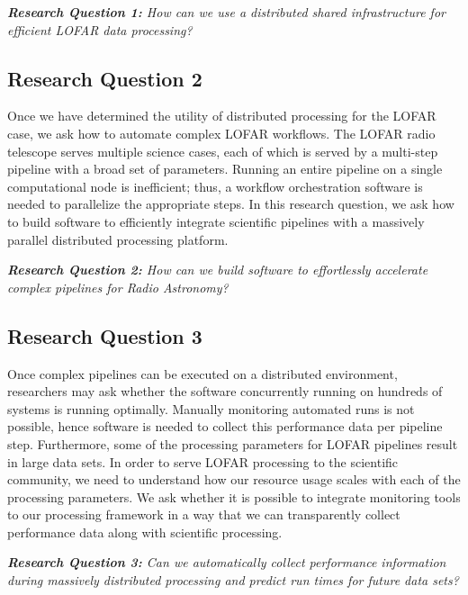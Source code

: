 \begin{addmargin}[4em]{8em}%
    \emph{\textbf{Research Question 1:} How can we use a distributed shared infrastructure for efficient LOFAR data processing?}
\end{addmargin}

\subsection{Research Question 2}

Once we have determined the utility of distributed processing for the LOFAR case, we ask how to automate complex LOFAR workflows. The LOFAR radio telescope serves multiple science cases, each of which is served by a multi-step pipeline with a broad set of parameters. Running an entire pipeline on a single computational node is inefficient; thus, a workflow orchestration software is needed to parallelize the appropriate steps. In this research question, we ask how to build software to efficiently integrate scientific pipelines with a massively parallel distributed processing platform. 

\begin{addmargin}[4em]{8em}%
    \emph{\textbf{Research Question 2:} How can we build software to effortlessly accelerate complex pipelines for Radio Astronomy?} 
\end{addmargin}


\subsection{Research Question 3}

Once complex pipelines can be executed on a distributed environment, researchers may ask whether the software concurrently running on hundreds of systems is running optimally. Manually monitoring automated runs is not possible, hence software is needed to collect this performance data per pipeline step. Furthermore, some of the processing parameters for LOFAR pipelines result in large data sets. In order to serve LOFAR processing to the scientific community, we need to understand how our resource usage scales with each of the processing parameters. We ask whether it is possible to integrate monitoring tools to our processing framework in a way that we can transparently collect performance data along with scientific processing.     


\begin{addmargin}[4em]{8em}%
    \emph{\textbf{Research Question 3:} Can we automatically collect performance information during massively distributed processing and predict run times for future data sets?}
\end{addmargin}
